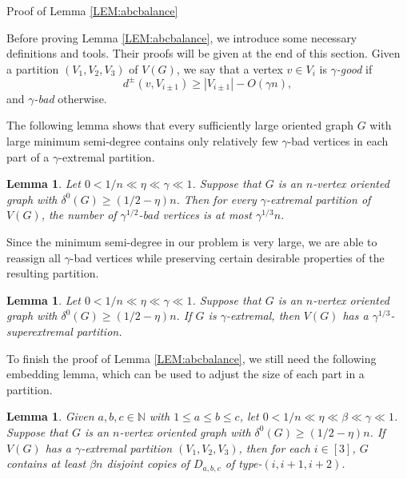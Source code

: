 \documentclass[11pt,a4paper,reqno]{amsart}
\makeatletter
\renewcommand\section{\@startsection{section}{1}%
  \z@{-1.0\linespacing\@plus-.7\linespacing}{1\linespacing}%
  {\normalfont\bfseries\large\centering}}
\newtheorem{lemma}[theorem]{Lemma}
\theoremstyle{definition} %
\makeatother
\begin{document}

\section{Proof of Lemma \ref{LEM:abcbalance}}\label{SEC-5.3}

Before proving Lemma \ref{LEM:abcbalance}, we introduce some necessary definitions and tools. Their proofs will be given at the end of this section. Given a partition $(V_1,V_2,V_3)$ of $V(G)$, we say that a vertex $v\in V_i$ is \emph{$\gamma$-good} if
$$
d^\pm(v,V_{i\pm 1}) \geqslant |V_{i\pm 1}|-O(\gamma n),
$$
and \emph{$\gamma$-bad} otherwise.

The following lemma shows that every sufficiently large oriented graph $G$ with large minimum semi-degree contains only relatively few $\gamma$-bad vertices in each part of a $\gamma$-extremal partition.



\begin{lemma}\label{LEM:extremal-badvertex}
Let $0<1/n \ll \eta \ll \gamma \ll 1$. 
Suppose that $G$ is an $n$-vertex oriented graph with $\delta^0(G)\geqslant(1/2-\eta)n$.
Then for every $\gamma$-extremal partition of $V(G)$, the number of $\gamma^{1/2}$-bad vertices is at most $\gamma^{1/3}n$.
\end{lemma}

Since the minimum semi-degree in our problem is very large, we are able to reassign all $\gamma$-bad vertices while preserving certain desirable properties of the resulting partition.

\begin{lemma}\label{LEM:fexbad}
    Let $0<1/n\ll \eta \ll\gamma \ll 1$. Suppose that $G$ is an $n$-vertex oriented graph with $\delta^0(G)\geqslant(1/2-\eta)n$. If $G$ is $\gamma$-extremal, then $V(G)$ has a $\gamma^{1/3}$-superextremal partition. 
\end{lemma} 

To finish the proof of Lemma \ref{LEM:abcbalance}, we still need the following embedding lemma, which can be used to adjust the size of each part in a partition.

\begin{lemma}\label{LEM:greedily Dabc}
    Given $a,b,c\in\mathbb{N}$ with $1\leqslant a\leqslant b\leqslant c$, let $0<1/n \ll \eta \ll \beta \ll \gamma \ll 1$. Suppose that $G$ is an $n$-vertex oriented graph with $\delta^0(G)\geqslant(1/2-\eta)n$. If $V(G)$ has a $\gamma$-extremal partition $(V_1,V_2,V_3)$, then for each $i\in[3]$, $G$ contains at least $\beta n$ disjoint copies of $D_{a,b,c}$ of type-$(i,i+1,i+2)$.
\end{lemma}
\end{document}

